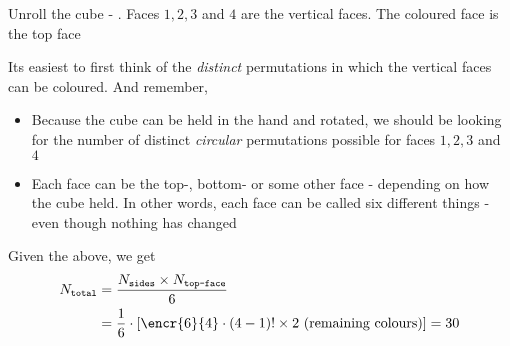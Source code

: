 \fi 

\begin{solution}[\halfpage]
	Unroll the cube - \asif. Faces $1,2,3$ and $4$ are the vertical faces. The coloured face is the top face
	
	Its easiest to first think of the \textit{distinct} permutations in which the vertical faces can be 
	coloured. And remember, 
	\begin{itemize}\itemsep0pt
		\item Because the cube can be held in the hand and rotated, we should be looking 
		for the number of distinct \textit{circular} permutations possible for faces $1,2,3$ and $4$ \\
		\item Each face can be the top-, bottom- or some other face - depending on how the cube held. In other words, 
		each face can be called six different things - even though nothing has changed
	\end{itemize}		
	
	
	Given the above, we get 
	\begin{align}
		N_{\texttt{total}} &= \dfrac{N_{\texttt{sides}} \times N_{\texttt{top-face}}}{6} \\
		&= \dfrac{1}{6}\cdot\left[ \encr{6}{4}\cdot (4-1)! \times 2 \text{ (remaining colours)}\right] = 30
	\end{align}
\end{solution}

